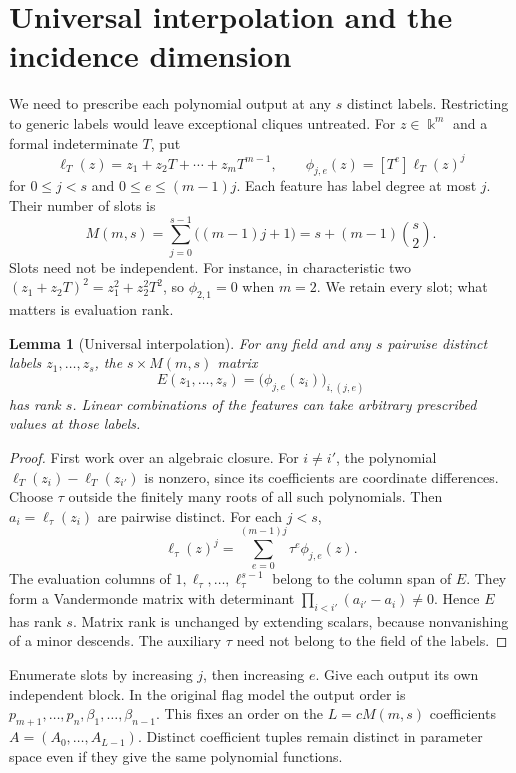 \documentclass[11pt,a4paper]{article}
\newtheorem{lemma}[theorem]{Lemma}
\theoremstyle{definition}
\theoremstyle{remark}
\numberwithin{equation}{section}
\begin{document}
\section{Universal interpolation and the incidence dimension}\label{sec:interpolation}
We need to prescribe each polynomial output at any $s$ distinct labels. Restricting to generic labels would leave exceptional cliques untreated. For $z\in\Bbbk^m$ and a formal indeterminate $T$, put
\begin{equation}\label{eq:compressed-features}
\ell_T(z)=z_1+z_2T+\cdots+z_mT^{m-1},\qquad
\phi_{j,e}(z)=[T^e]\ell_T(z)^j
\end{equation}
for $0\le j<s$ and $0\le e\le(m-1)j$. Each feature has label degree at most $j$. Their number of slots is
\begin{equation}\label{eq:M}
M(m,s)=\sum_{j=0}^{s-1}\bigl((m-1)j+1\bigr)=s+(m-1)\binom s2.
\end{equation}
Slots need not be independent. For instance, in characteristic two $(z_1+z_2T)^2=z_1^2+z_2^2T^2$, so $\phi_{2,1}=0$ when $m=2$. We retain every slot; what matters is evaluation rank.

\begin{lemma}[Universal interpolation]\label{lem:interpolation}
For any field and any $s$ pairwise distinct labels $z_1,\ldots,z_s$, the $s\times M(m,s)$ matrix
\[
E(z_1,\ldots,z_s)=\bigl(\phi_{j,e}(z_i)\bigr)_{i,(j,e)}
\]
has rank $s$. Linear combinations of the features can take arbitrary prescribed values at those labels.
\end{lemma}

\begin{proof}
First work over an algebraic closure. For $i\ne i'$, the polynomial $\ell_T(z_i)-\ell_T(z_{i'})$ is nonzero, since its coefficients are coordinate differences. Choose $\tau$ outside the finitely many roots of all such polynomials. Then $a_i=\ell_\tau(z_i)$ are pairwise distinct. For each $j<s$,
\[
\ell_\tau(z)^j=\sum_{e=0}^{(m-1)j}\tau^e\phi_{j,e}(z).
\]
The evaluation columns of $1,\ell_\tau,\ldots,\ell_\tau^{s-1}$ belong to the column span of $E$. They form a Vandermonde matrix with determinant $\prod_{i<i'}(a_{i'}-a_i)\ne0$. Hence $E$ has rank $s$. Matrix rank is unchanged by extending scalars, because nonvanishing of a minor descends. The auxiliary $\tau$ need not belong to the field of the labels.
\end{proof}

Enumerate slots by increasing $j$, then increasing $e$. Give each output its own independent block. In the original flag model the output order is $p_{m+1},\ldots,p_n,\beta_1,\ldots,\beta_{n-1}$. This fixes an order on the $L=cM(m,s)$ coefficients $A=(A_0,\ldots,A_{L-1})$. Distinct coefficient tuples remain distinct in parameter space even if they give the same polynomial functions.
\end{document}
